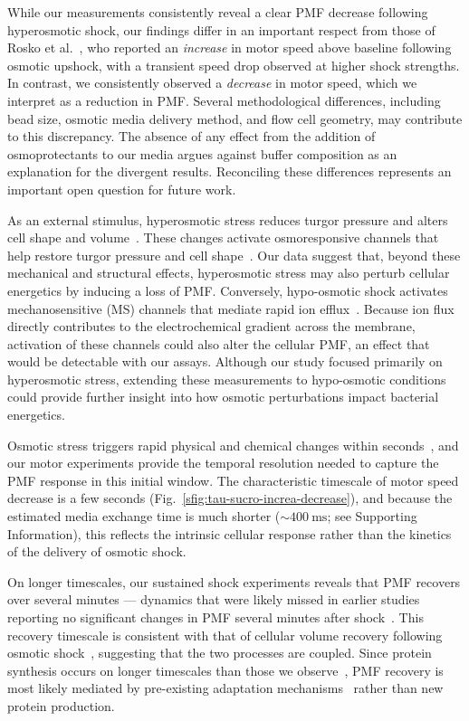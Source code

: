 \documentclass[twocolumn]{biophys-new}%
\begin{document}
While our measurements consistently reveal a clear PMF decrease following hyperosmotic shock, our findings differ in an important respect from those of Rosko et al.~\cite{rosko-2017}, who reported an \textit{increase} in motor speed above baseline following osmotic upshock, with a transient speed drop observed at higher shock strengths. In contrast, we consistently observed a \textit{decrease} in motor speed, which we interpret as a reduction in PMF. Several methodological differences, including bead size, osmotic media delivery method, and flow cell geometry, may contribute to this discrepancy.  The absence of any effect from the addition of osmoprotectants to our media argues against buffer composition as an explanation for the divergent results. Reconciling these differences represents an important open question for future work.

As an external stimulus, hyperosmotic stress reduces turgor pressure and alters cell shape and volume~\cite{pilizota_2012,pilizota2013plasmolysis,Rojas2020}. These changes activate osmoresponsive channels that help restore turgor pressure and cell shape~\cite{sleator_hill}. Our data suggest that, beyond these mechanical and structural effects, hyperosmotic stress may also perturb cellular energetics by inducing a loss of PMF. Conversely, hypo-osmotic shock activates mechanosensitive (MS) channels that mediate rapid ion efflux~\cite{wood2010,bremer2019responses}. Because ion flux directly contributes to the electrochemical gradient across the membrane, activation of these channels could also alter the cellular PMF, an effect that would be detectable with our assays. Although our study focused primarily on hyperosmotic stress, extending these measurements to hypo-osmotic conditions could provide further insight into how osmotic perturbations impact bacterial energetics.

Osmotic stress triggers rapid physical and chemical changes within seconds~\cite{pilizota_2012}, and our motor experiments provide the temporal resolution needed to capture the PMF response in this initial window. The characteristic timescale of motor speed decrease is a few seconds (Fig.~\ref{sfig:tau-sucro-increa-decrease}), and because the estimated media exchange time is much shorter ($\sim400~\textrm{ms}$; see Supporting Information), this reflects the intrinsic cellular response rather than the kinetics of the delivery of osmotic shock.

On longer timescales, our sustained shock experiments reveals that PMF recovers over several minutes --- dynamics that were likely missed in earlier studies reporting no significant changes in PMF several minutes after shock~\cite{HOUSSIN1991,shabala_2009}. This recovery timescale is consistent with that of cellular volume recovery following osmotic shock~\cite{pilizota_2012,rosko-2017}, suggesting that the two processes are coupled. Since protein synthesis occurs on longer timescales than those we observe~\cite{poolman2002membrane,weber2006time}, PMF recovery is most likely mediated by pre-existing adaptation mechanisms~\cite{sleator_hill,wood2010,poolman2023} rather than new protein production.
\end{document}
